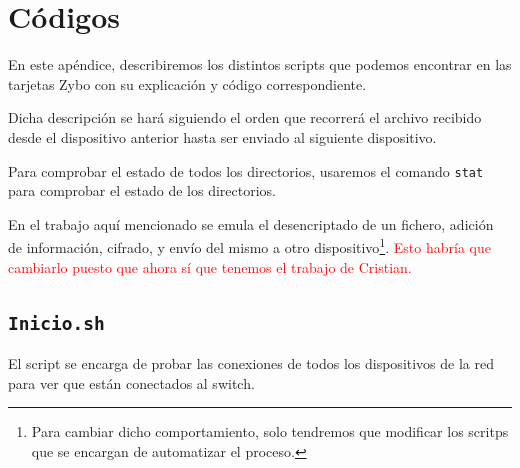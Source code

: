 \chapter{Códigos}
En este apéndice, describiremos los distintos scripts que podemos encontrar en las tarjetas Zybo con su explicación y código correspondiente.

Dicha descripción se hará siguiendo el orden que recorrerá el archivo recibido desde el dispositivo anterior hasta ser enviado al siguiente dispositivo.

Para comprobar el estado de todos los directorios, usaremos el comando \texttt{stat} para comprobar el estado de los directorios.

En el trabajo aquí mencionado se emula el desencriptado de un fichero, adición de información, cifrado, y envío del mismo a otro dispositivo\footnote{Para cambiar dicho comportamiento, solo tendremos que modificar los scritps que se encargan de automatizar el proceso.}. \textcolor{red}{Esto habría que cambiarlo puesto que ahora sí que tenemos el trabajo de Cristian.}

\newpage
\section{\texttt{Inicio.sh}}
\hypertarget{ScriptConexion}{}
El script se encarga de probar las conexiones de todos los dispositivos de la red para ver que están conectados al switch.

